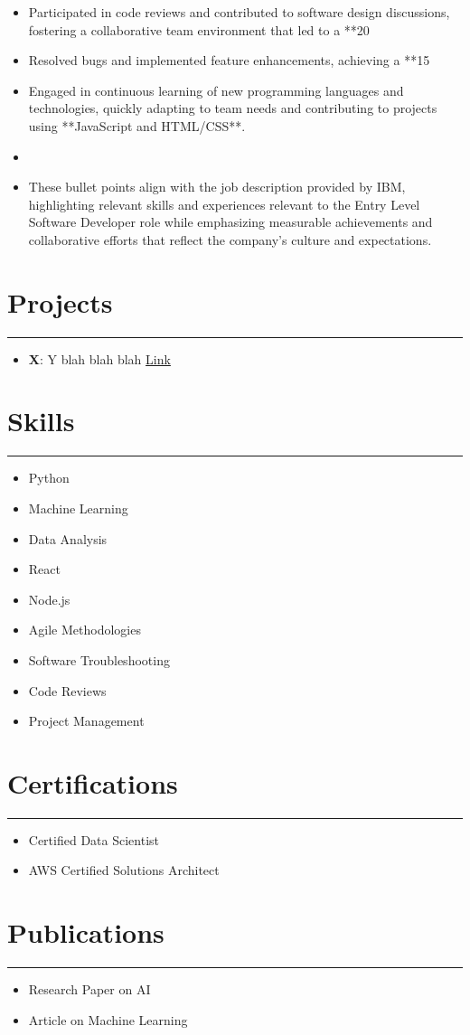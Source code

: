 \documentclass[a4paper,10pt]{article}
\begin{document}
\begin{itemize}[leftmargin=*]
\begin{itemize}[noitemsep]
\item Participated in code reviews and contributed to software design discussions, fostering a collaborative team environment that led to a **20%
\item Resolved bugs and implemented feature enhancements, achieving a **15%
\item Engaged in continuous learning of new programming languages and technologies, quickly adapting to team needs and contributing to projects using **JavaScript and HTML/CSS**.
\item 
\item These bullet points align with the job description provided by IBM, highlighting relevant skills and experiences relevant to the Entry Level Software Developer role while emphasizing measurable achievements and collaborative efforts that reflect the company’s culture and expectations.
\end{itemize}
\end{itemize}

\section*{Projects}
\rule{\textwidth}{0.5pt}
\begin{itemize}[leftmargin=*]
\item \textbf{X}: Y blah blah blah \href{https://github.com/haveagoodday}{Link}
\end{itemize}

\section*{Skills}
\rule{\textwidth}{0.5pt}
\begin{itemize}[leftmargin=*]
\item Python
\item Machine Learning
\item Data Analysis
\item React
\item Node.js
\item Agile Methodologies
\item Software Troubleshooting
\item Code Reviews
\item Project Management
\end{itemize}

\section*{Certifications}
\rule{\textwidth}{0.5pt}
\begin{itemize}[leftmargin=*]
\item Certified Data Scientist
\item AWS Certified Solutions Architect
\end{itemize}

\section*{Publications}
\rule{\textwidth}{0.5pt}
\begin{itemize}[leftmargin=*]
\item Research Paper on AI
\item Article on Machine Learning
\end{itemize}
\end{document}
